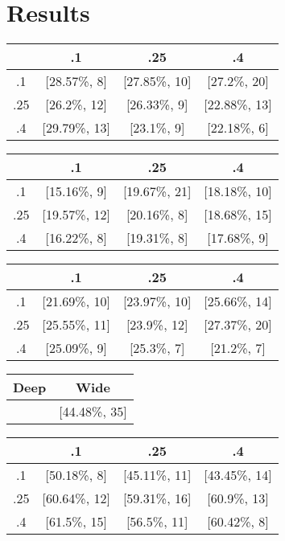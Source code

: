 \chapter{Results}

\begin{table}
    \centering
    \begin{tabular}{c|c|c|c}
        &.1&.25&.4\\
        \hline
        .1&[28.57\%, 8]& [27.85\%, 10]& [27.2\%, 20]\\
        .25&[26.2\%, 12]& [26.33\%, 9]& [22.88\%, 13]\\
        .4&[29.79\%, 13]& [23.1\%, 9]& [22.18\%, 6]\\
        \hline
    \end{tabular}
\end{table}

\begin{table}
    \centering
    \begin{tabular}{c|c|c|c}
        & .1& .25& .4\\
        \hline
        .1&[15.16\%, 9]& [19.67\%, 21]& [18.18\%, 10]\\
        .25&[19.57\%, 12]& [20.16\%, 8]& [18.68\%, 15]\\
        .4&[16.22\%, 8]& [19.31\%, 8]& [17.68\%, 9]\\
        \hline
    \end{tabular}
\end{table}

\begin{table}
    \centering
    \begin{tabular}{c|c|c|c}
        &.1&.25&.4\\
        \hline
        .1&[21.69\%, 10]& [23.97\%, 10]& [25.66\%, 14]\\
        .25&[25.55\%, 11]& [23.9\%, 12]& [27.37\%, 20]\\
        .4&[25.09\%, 9]& [25.3\%, 7]& [21.2\%, 7]\\
        \hline
    \end{tabular}
\end{table}

\begin{table}
    \centering
    \begin{tabular}{c|c}
        Deep& Wide\\
        \hline
        [38\%, 65]&[44.48\%, 35]\\
        \hline
    \end{tabular}
\end{table}


\begin{table}
    \centering
    \begin{tabular}{c|c|c|c}
        &.1&.25&.4\\
        \hline
        .1&[50.18\%, 8]& [45.11\%, 11]& [43.45\%, 14]\\
        .25&[60.64\%, 12]& [59.31\%, 16]& [60.9\%, 13]\\
        .4&[61.5\%, 15]& [56.5\%, 11]& [60.42\%, 8]\\
        \hline
    \end{tabular}
\end{table}

